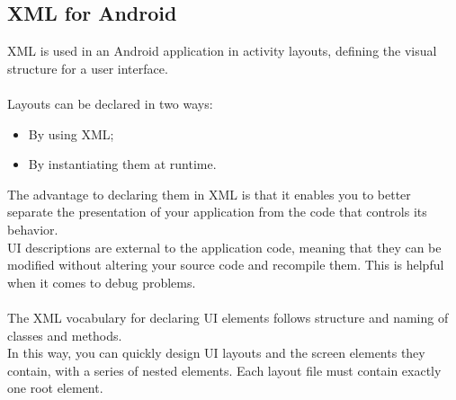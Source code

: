 \subsection{XML for Android}
\label{subsect:XML for Android}
XML is used in an Android application in activity layouts, defining the visual structure for a user interface. \\\\
Layouts can be declared in two ways:
\begin{itemize}
\item By using XML;
\item By instantiating them at runtime.
\end{itemize}
The advantage to declaring them in XML is that it enables you to better separate the presentation of your application from the code that controls its behavior. \\
UI descriptions are external to the application code, meaning that they can be modified without altering your source code and recompile them. This is helpful when it comes to debug problems. \\\\
The XML vocabulary for declaring UI elements follows structure and naming of classes and methods.\\
In this way, you can quickly design UI layouts and the screen elements they contain, with a series of nested elements. Each layout file must contain exactly one root element.

